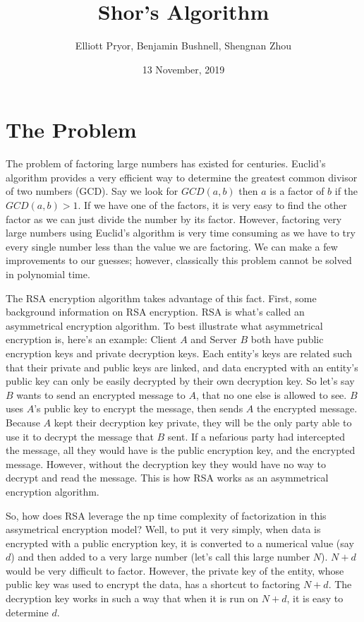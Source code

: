 \documentclass[a4paper]{article}
\title{Shor's Algorithm}
\author{Elliott Pryor, Benjamin Bushnell, Shengnan Zhou}
\date{13 November, 2019}
\begin{document}
\maketitle %
\section{The Problem}
The problem of factoring large numbers has existed for centuries. Euclid's algorithm provides a very efficient way to determine the greatest common divisor of two numbers (GCD).
Say we look for $GCD(a,b)$ then $a$ is a factor of $b$ if the $GCD(a, b) > 1$. If we have one of the factors,
it is very easy to find the other factor as we can just divide the number by its factor.
However, factoring very large numbers using Euclid's algorithm is very time consuming as we have to try every single number less than the value we are factoring.
We can make a few improvements to our guesses; however, classically this problem cannot be solved in polynomial time.

The RSA encryption algorithm takes advantage of this fact. First, some background information on RSA encryption.
RSA is what's called an asymmetrical encryption algorithm. To best illustrate what asymmetrical encryption is,
here's an example: Client $A$ and Server $B$ both have public encryption keys and private decryption keys.
Each entity's keys are related such that their private and public keys are linked,
and data encrypted with an entity's public key can only be easily decrypted by their own decryption key.
So let's say $B$ wants to send an encrypted message to $A$, that no one else is allowed to see.
$B$ uses $A$'s public key to encrypt the message, then sends $A$ the encrypted message.
Because $A$ kept their decryption key private, they will be the only party able to use it to decrypt the message that $B$ sent.
If a nefarious party had intercepted the message, all they would have is the public encryption key,
and the encrypted message. However, without the decryption key they would have no way to decrypt and read the message.
This is how RSA works as an asymmetrical encryption algorithm. \cite{ytRSA}

So, how does RSA leverage the np time complexity of factorization in this assymetrical encryption model? Well,
to put it very simply, when data is encrypted with a public encryption key, it is converted to a numerical value (say $d$) and then added to a very large number (let's call this large number $N$).
$N+d$ would be very difficult to factor. However, the private key of the entity,
whose public key was used to encrypt the data, has a shortcut to factoring $N+d$.
The decryption key works in such a way that when it is run on $N + d$, it is easy to determine $d$.
\cite{ytRSA}
\end{document}
